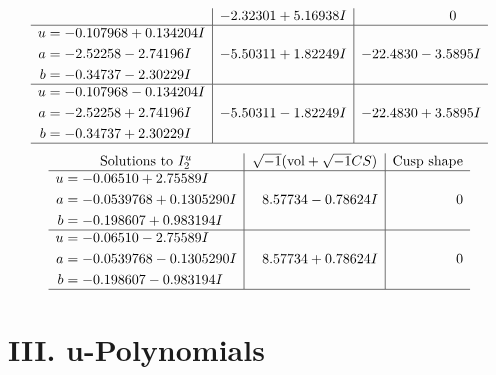 \documentclass[1p]{elsarticle_modified}
\theoremstyle{definition}
\newcommand{\I}{\sqrt{-1}}
\begin{document}
$$\begin{array}{c|c|c}
 & -2.32301 + 5.16938 I & \phantom{-0.000000 } 0 \\ \hline\begin{aligned}
u &= -0.107968 + 0.134204 I \\
a &= -2.52258 - 2.74196 I \\
b &= -0.34737 - 2.30229 I\end{aligned}
 & -5.50311 + 1.82249 I & -22.4830 - 3.5895 I \\ \hline\begin{aligned}
u &= -0.107968 - 0.134204 I \\
a &= -2.52258 + 2.74196 I \\
b &= -0.34737 + 2.30229 I\end{aligned}
 & -5.50311 - 1.82249 I & -22.4830 + 3.5895 I\\
 \hline 
 \end{array}$$\newpage$$\begin{array}{c|c|c}  
\text{Solutions to }I^u_{2}& \I (\text{vol} + \sqrt{-1}CS) & \text{Cusp shape}\\
 \hline 
\begin{aligned}
u &= -0.06510 + 2.75589 I \\
a &= -0.0539768 + 0.1305290 I \\
b &= -0.198607 + 0.983194 I\end{aligned}
 & \phantom{-}8.57734 - 0.78624 I & \phantom{-0.000000 } 0 \\ \hline\begin{aligned}
u &= -0.06510 - 2.75589 I \\
a &= -0.0539768 - 0.1305290 I \\
b &= -0.198607 - 0.983194 I\end{aligned}
 & \phantom{-}8.57734 + 0.78624 I & \phantom{-0.000000 } 0\\
 \hline 
 \end{array}$$\newpage
\newpage\renewcommand{\arraystretch}{1}
\centering \section*{ III. u-Polynomials}
\end{document}
